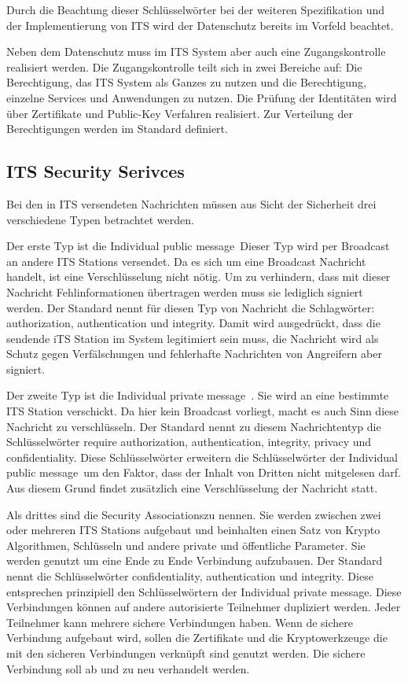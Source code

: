 Durch die Beachtung dieser Schlüsselwörter bei der weiteren Spezifikation und der Implementierung von \ac{ITS} wird der Datenschutz bereits im Vorfeld beachtet. 

Neben dem Datenschutz muss im \ac{ITS} System aber auch eine Zugangskontrolle realisiert werden. Die Zugangskontrolle teilt sich in zwei Bereiche auf: Die Berechtigung, das \ac{ITS} System als Ganzes zu nutzen und die Berechtigung, einzelne Services und Anwendungen zu nutzen. Die Prüfung der Identitäten wird über Zertifikate und Public-Key Verfahren realisiert. Zur Verteilung der Berechtigungen werden im Standard \cite{ts102731} definiert.

\subsection{ITS Security Serivces}
Bei den in \ac{ITS} versendeten Nachrichten müssen aus Sicht der Sicherheit drei verschiedene Typen betrachtet werden. 

Der erste Typ ist die \glqq Individual public message\grqq~Dieser Typ wird per Broadcast an andere \ac{ITS} Stations versendet. Da es sich um eine Broadcast Nachricht handelt, ist eine Verschlüsselung nicht nötig. Um zu verhindern, dass mit dieser Nachricht Fehlinformationen übertragen werden muss sie lediglich signiert werden. Der Standard \cite{ts102731} nennt für diesen Typ von Nachricht die Schlagwörter: authorization, authentication und integrity. Damit wird ausgedrückt, dass die sendende \ac{iTS} Station im System legitimiert sein muss, die Nachricht wird als Schutz gegen Verfälschungen und fehlerhafte Nachrichten von Angreifern aber signiert.

Der zweite Typ ist die \glqq    Individual private message\grqq~. Sie wird an eine bestimmte \ac{ITS} Station verschickt. Da hier kein Broadcast vorliegt, macht es auch Sinn diese Nachricht zu verschlüsseln. Der Standard nennt zu diesem Nachrichtentyp die Schlüsselwörter require authorization, authentication, integrity, privacy und confidentiality. Diese Schlüsselwörter erweitern die Schlüsselwörter der \glqq Individual public message\grqq~um den Faktor, dass der Inhalt von Dritten nicht mitgelesen darf. Aus diesem Grund findet zusätzlich eine Verschlüsselung der Nachricht statt.

Als drittes sind die \glqq Security Associations\grqq zu nennen. Sie werden zwischen zwei oder mehreren \ac{ITS} Stations aufgebaut und beinhalten einen Satz von Krypto Algorithmen, Schlüsseln und andere private und öffentliche Parameter. Sie werden genutzt um eine Ende zu Ende Verbindung aufzubauen.  Der Standard nennt die Schlüsselwörter confidentiality, authentication und integrity.  Diese entsprechen prinzipiell den Schlüsselwörtern der \glqq    Individual private message\grqq. Diese Verbindungen können auf andere autorisierte Teilnehmer dupliziert werden. Jeder Teilnehmer kann mehrere sichere Verbindungen haben. Wenn de sichere Verbindung aufgebaut wird, sollen die Zertifikate und die Kryptowerkzeuge die mit den sicheren Verbindungen verknüpft sind genutzt werden. Die sichere Verbindung soll ab und zu neu verhandelt werden. 

